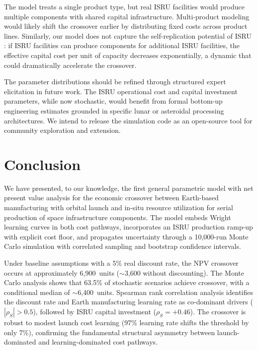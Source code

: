 \documentclass[preprint,12pt]{elsarticle}
\begin{document}
The model treats a single product type, but real ISRU facilities would produce multiple components with shared capital infrastructure. Multi-product modeling would likely shift the crossover earlier by distributing fixed costs across product lines. Similarly, our model does not capture the self-replication potential of ISRU \cite{metzger2013}: if ISRU facilities can produce components for additional ISRU facilities, the effective capital cost per unit of capacity decreases exponentially, a dynamic that could dramatically accelerate the crossover.

The parameter distributions should be refined through structured expert elicitation in future work. The ISRU operational cost and capital investment parameters, while now stochastic, would benefit from formal bottom-up engineering estimates grounded in specific lunar or asteroidal processing architectures. We intend to release the simulation code as an open-source tool for community exploration and extension.

\section{Conclusion}
\label{sec:conclusion}

We have presented, to our knowledge, the first general parametric model with net present value analysis for the economic crossover between Earth-based manufacturing with orbital launch and in-situ resource utilization for serial production of space infrastructure components. The model embeds Wright learning curves in both cost pathways, incorporates an ISRU production ramp-up with explicit cost floor, and propagates uncertainty through a 10{,}000-run Monte Carlo simulation with correlated sampling and bootstrap confidence intervals.

Under baseline assumptions with a 5\% real discount rate, the NPV crossover occurs at approximately 6{,}900~units ($\sim$3{,}600 without discounting). The Monte Carlo analysis shows that 63.5\% of stochastic scenarios achieve crossover, with a conditional median of $\sim$6{,}400~units. Spearman rank correlation analysis identifies the discount rate and Earth manufacturing learning rate as co-dominant drivers ($|\rho_S| > 0.5$), followed by ISRU capital investment ($\rho_S = +0.46$). The crossover is robust to modest launch cost learning (97\% learning rate shifts the threshold by only 7\%), confirming the fundamental structural asymmetry between launch-dominated and learning-dominated cost pathways.
\end{document}
